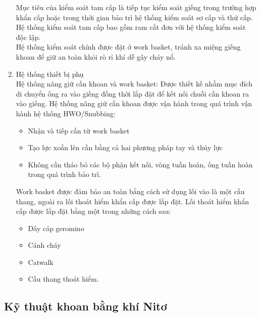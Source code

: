 \documentclass[12pt,a4paper]{article}
\begin{document}
\begin{enumerate}
		Mục tiêu của kiểm soát tam cấp là tiếp tục kiểm soát giếng trong trường hợp khẩn cấp hoặc trong thời gian bảo trì hệ thống kiểm soát sơ cấp và thứ cấp. Hệ thống kiểm soát tam cấp bao gồm ram cắt đơn với hệ thống kiểm soát độc lập.\\
		Hệ thống kiểm soát chính được đặt ở work basket, tránh xa miệng giếng khoan để giữ an toàn khỏi rò rỉ khí dễ gây cháy nổ.
		\item Hệ thống thiết bị phụ\\
		Hệ thống nâng giữ cần khoan và work basket: Được thiết kế nhằm mục đích di chuyển ống ra vào giếng đồng thời lắp đặt để kết nối chuỗi cần khoan ra vào giếng. Hệ thống nâng giữ cần khoan được vận hành trong quá trình vận hành hệ thống HWO/Snubbing:
			\begin{itemize}
				\item Nhận và tiếp cần từ work basket
				\item Tạo lực xoắn lên cần bằng cả hai phương pháp tay và thủy lực
				\item Không cần tháo bỏ các bộ phận kết nối, vòng tuần hoàn, ống tuần hoàn trong quá trình bảo trì.
			\end{itemize}
		Work basket được đảm bảo an toàn bằng cách sử dụng lối vào là một cầu thang, ngoài ra lối thoát hiểm khẩn cấp được lắp đặt. Lối thoát hiểm khẩn cấp được lắp đặt bằng một trong những cách sau:
			\begin{itemize}
				\item Dây cáp geromino
				\item Cánh cháy
				\item Catwalk 
				\item Cầu thang thoát hiểm.
			\end{itemize}
	\end{enumerate}
\subsection{Kỹ thuật khoan bằng khí Nitơ}
\end{document}
